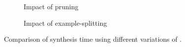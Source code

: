 \begin{figure}[t]
    \centering
    
    \begin{subfigure}[b]{0.45\textwidth}
         \centering
         \caption{Impact of pruning}
         \label{fig:mt_vs_nopruning}
     \end{subfigure}
     \hfill
     \begin{subfigure}[b]{0.45\textwidth}
         \centering
         \caption{Impact of example-splitting}
         \label{fig:mt_vs_dynamic}
     \end{subfigure}
\captionsetup{belowskip=-8pt}
\caption{Comparison of synthesis time using different variations of \Forest{}.}
\label{fig:time-comparison-funny}
\end{figure}